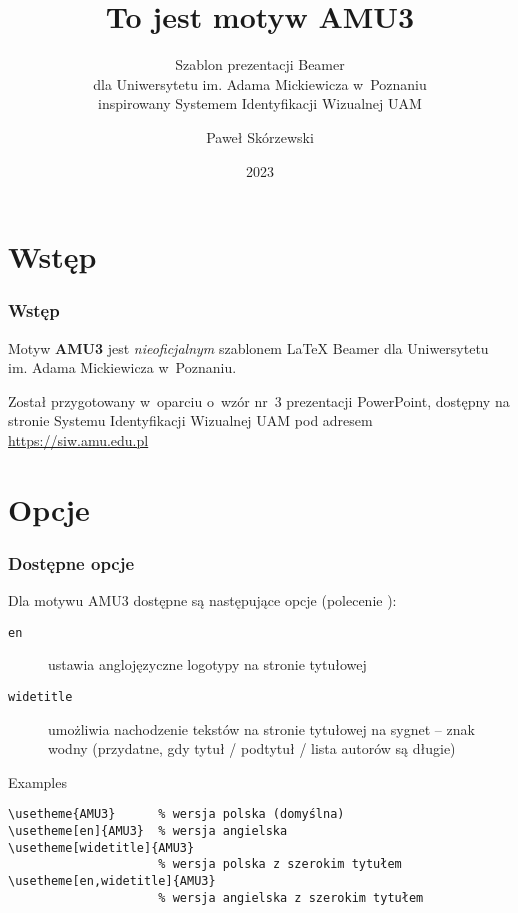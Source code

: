 \documentclass{beamer}
\title[Motyw AMU3]{To jest motyw AMU3}
\subtitle{Szablon prezentacji Beamer\\dla Uniwersytetu im. Adama Mickiewicza w~Poznaniu\\inspirowany Systemem Identyfikacji Wizualnej UAM}
\author[{P. Skórzewski}]{Paweł Skórzewski}
\date{2023}
\begin{document}
\begin{frame}
  \titlepage
\end{frame}


\section{Wstęp}

\begin{frame}
  \frametitle{Wstęp}
  Motyw \textbf{AMU3} jest \emph{nieoficjalnym} szablonem \LaTeX{} Beamer dla Uniwersytetu im. Adama Mickiewicza w~Poznaniu.

  \medskip

  Został przygotowany w~oparciu o~wzór nr~3 prezentacji PowerPoint, dostępny na stronie Systemu Identyfikacji Wizualnej UAM pod adresem \url{https://siw.amu.edu.pl}
\end{frame}

\section{Opcje}

\begin{frame}[containsverbatim]
  \frametitle{Dostępne opcje}
  Dla motywu AMU3 dostępne są następujące opcje (polecenie \texttt{}):
  \begin{description}
    \item [\texttt{en}] ustawia anglojęzyczne logotypy na stronie tytułowej
    \item [\texttt{widetitle}] umożliwia nachodzenie tekstów na stronie tytułowej na sygnet -- znak wodny (przydatne, gdy tytuł / podtytuł / lista autorów są długie)
  \end{description}
  \begin{exampleblock}{Examples}
    \begin{verbatim}
\usetheme{AMU3}      % wersja polska (domyślna)
\usetheme[en]{AMU3}  % wersja angielska
\usetheme[widetitle]{AMU3}
                     % wersja polska z szerokim tytułem
\usetheme[en,widetitle]{AMU3}
                     % wersja angielska z szerokim tytułem
    \end{verbatim}
  \end{exampleblock}
\end{frame}
\end{document}
